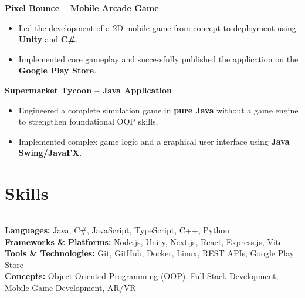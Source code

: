 \documentclass[10pt,a4paper]{article}
\newcommand{\cvsection}[1]{\vspace{6mm}\section*{\large\textbf{#1}}\vspace{-3mm}\hrule\vspace{2mm}}
\newcommand{\cvproject}[1]{\vspace{3mm}\noindent\textbf{#1}}
\begin{document}
\cvproject{Pixel Bounce – Mobile Arcade Game}
\begin{itemize} \itemsep -1pt
    \item Led the development of a 2D mobile game from concept to deployment using \textbf{Unity} and \textbf{C\#}.
    \item Implemented core gameplay and successfully published the application on the \textbf{Google Play Store}.
\end{itemize}

\cvproject{Supermarket Tycoon – Java Application}
\begin{itemize} \itemsep -1pt
    \item Engineered a complete simulation game in \textbf{pure Java} without a game engine to strengthen foundational OOP skills.
    \item Implemented complex game logic and a graphical user interface using \textbf{Java Swing/JavaFX}.
\end{itemize}

\cvsection{Skills}
\vspace{1mm}
\noindent\textbf{Languages:} Java, C\#, JavaScript, TypeScript, C++, Python\\[2mm]
\noindent\textbf{Frameworks \& Platforms:} Node.js, Unity, Next.js, React, Express.js, Vite\\[2mm]
\noindent\textbf{Tools \& Technologies:} Git, GitHub, Docker, Linux, REST APIs, Google Play Store\\[2mm]
\noindent\textbf{Concepts:} Object-Oriented Programming (OOP), Full-Stack Development, Mobile Game Development, AR/VR
\end{document}
